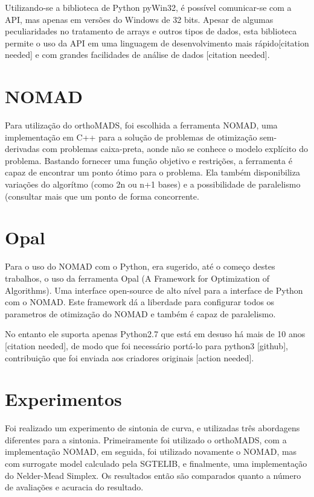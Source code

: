  Utilizando-se a biblioteca de Python pyWin32, é possível comunicar-se com a API, mas apenas em versões do Windows de 32 bits. Apesar de algumas peculiaridades no tratamento de arrays e outros tipos de dados, esta biblioteca permite o uso da API em uma linguagem de desenvolvimento mais rápido[citation needed] e com grandes facilidades de análise de dados [citation needed].

\section{NOMAD}
Para utilização do orthoMADS, foi escolhida a ferramenta NOMAD, uma implementação em C++ para a solução de problemas de otimização sem-derivadas com problemas caixa-preta, aonde não se conhece o modelo explícito do problema. Bastando fornecer uma função objetivo e restrições, a ferramenta é capaz de encontrar um ponto ótimo para o problema. Ela também  disponibiliza variações do algorítmo (como 2n ou n+1 bases) e a possibilidade de paralelismo (consultar mais que um ponto de forma concorrente.  


\section{Opal}
Para o uso do NOMAD com o Python, era sugerido, até o começo destes trabalhos, o uso da ferramenta Opal (A Framework for Optimization of Algorithms). Uma interface open-source de alto nível para a interface de Python com o NOMAD. Este framework dá a liberdade para configurar todos os parametros de otimização do NOMAD e também é capaz de paralelismo.

No entanto ele suporta apenas Python2.7 que está em desuso há mais de 10 anos [citation needed], de modo que foi necessário portá-lo para python3 [github], contribuição que foi enviada aos criadores originais [action needed].



\section{Experimentos}
Foi realizado um experimento de sintonia de curva, e utilizadas três abordagens diferentes para a sintonia. Primeiramente foi utilizado o orthoMADS, com a implementação NOMAD, em seguida, foi utilizado novamente o NOMAD, mas com surrogate model calculado pela SGTELIB, e finalmente, uma implementação do Nelder-Mead Simplex. Os resultados então são comparados quanto a número de avaliações e acuracia do resultado.

